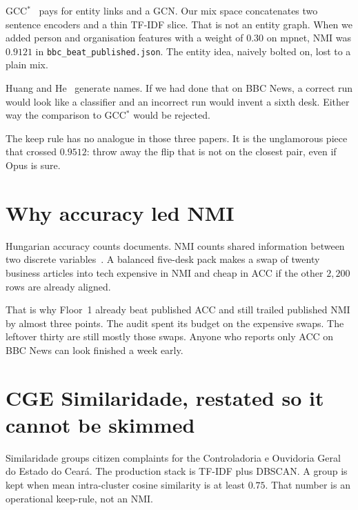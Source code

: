 \documentclass[11pt,a4paper]{article}
\begin{document}
GCC$^*$~\cite{keraghel2024gcc} pays for entity links and a
GCN. Our mix space concatenates two sentence encoders and a
thin TF-IDF slice. That is not an entity graph. When we
added person and organisation features with a weight of
$0.30$ on mpnet, NMI was $0.9121$ in
\texttt{bbc\_beat\_published.json}. The entity idea, naively
bolted on, lost to a plain mix.

Huang and He~\cite{huang2024tcllc} generate names. If we had
done that on BBC News, a correct run would look like a
classifier and an incorrect run would invent a sixth desk.
Either way the comparison to GCC$^*$ would be rejected.

The keep rule has no analogue in those three papers. It is
the unglamorous piece that crossed $0.9512$: throw away the
flip that is not on the closest pair, even if Opus is sure.

\section{Why accuracy led NMI}

Hungarian accuracy counts documents. NMI counts shared
information between two discrete variables~\cite{vinh2010nmi}.
A balanced five-desk pack makes a swap of twenty business
articles into tech expensive in NMI and cheap in ACC if the
other $2{,}200$ rows are already aligned.

That is why Floor~1 already beat published ACC and still
trailed published NMI by almost three points. The audit
spent its budget on the expensive swaps. The leftover thirty
are still mostly those swaps. Anyone who reports only ACC on
BBC News can look finished a week early.

\section{CGE Similaridade, restated so it cannot be skimmed}

Similaridade groups citizen complaints for the Controladoria
e Ouvidoria Geral do Estado do Cear\'{a}. The production
stack is TF-IDF plus DBSCAN. A group is kept when mean
intra-cluster cosine similarity is at least $0.75$. That
number is an operational keep-rule, not an NMI.
\end{document}
